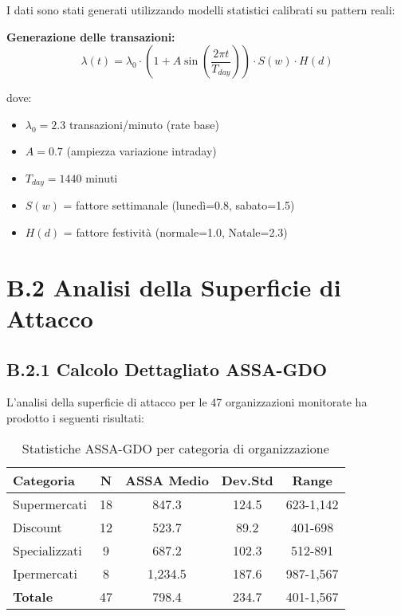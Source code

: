 I dati sono stati generati utilizzando modelli statistici calibrati su pattern reali:

\textbf{Generazione delle transazioni:}
\begin{equation}
\lambda(t) = \lambda_0 \cdot \left(1 + A \sin\left(\frac{2\pi t}{T_{day}}\right)\right) \cdot S(w) \cdot H(d)
\end{equation}

dove:
\begin{itemize}
    \item $\lambda_0 = 2.3$ transazioni/minuto (rate base)
    \item $A = 0.7$ (ampiezza variazione intraday)
    \item $T_{day} = 1440$ minuti
    \item $S(w)$ = fattore settimanale (lunedì=0.8, sabato=1.5)
    \item $H(d)$ = fattore festività (normale=1.0, Natale=2.3)
\end{itemize}

\section{B.2 Analisi della Superficie di Attacco}

\subsection{B.2.1 Calcolo Dettagliato ASSA-GDO}

L'analisi della superficie di attacco per le 47 organizzazioni monitorate ha prodotto i seguenti risultati:

\begin{table}[htbp]
\centering
\caption{Statistiche ASSA-GDO per categoria di organizzazione}
\begin{tabular}{|l|c|c|c|c|}
\hline
\textbf{Categoria} & \textbf{N} & \textbf{ASSA Medio} & \textbf{Dev.Std} & \textbf{Range} \\
\hline
Supermercati & 18 & 847.3 & 124.5 & 623-1,142 \\
Discount & 12 & 523.7 & 89.2 & 401-698 \\
Specializzati & 9 & 687.2 & 102.3 & 512-891 \\
Ipermercati & 8 & 1,234.5 & 187.6 & 987-1,567 \\
\hline
\textbf{Totale} & 47 & 798.4 & 234.7 & 401-1,567 \\
\hline
\end{tabular}
\end{table}

